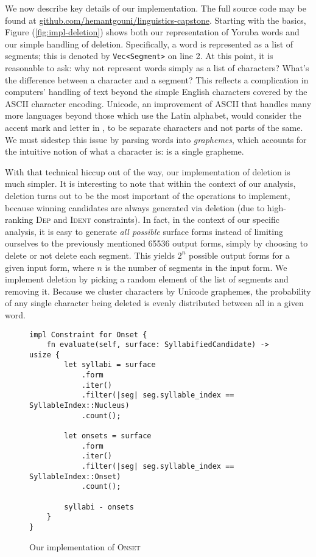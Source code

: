 \documentclass[12pt]{article}
\newcommand{\ident}{\textsc{Ident}}
\newcommand{\dep}{\textsc{Dep}}
\newcommand{\onset}{\textsc{Onset}}
\newcommand{\pref}[1]{(\ref{#1})}
\begin{document}
We now describe key details of our implementation. The full source code may be
found at \href{https://github.com/hemantgouni/linguistics-capstone}{github.com/hemantgouni/linguistics-capstone}.
Starting with the basics, Figure \pref{fig:impl-deletion} shows both our
representation of Yoruba words and our simple handling of deletion.
Specifically, a word is represented as a list of segments; this is denoted by
\texttt{Vec<Segment>} on line 2.
At this point, it is reasonable to ask: why not represent words simply
as a list of characters? What's the difference between a character and a segment?
This reflects a complication in computers' handling of text beyond the
simple English characters covered by the ASCII character encoding. Unicode, an
improvement of ASCII that handles many more languages beyond those which use the
Latin alphabet, would consider the accent mark and letter  in ,
to be separate characters and not parts of the same. We must sidestep this issue by
parsing words into \textit{graphemes}, which accounts for the intuitive notion
of what a character is:  is a single grapheme.

With that technical hiccup out of the way, our implementation of deletion is much
simpler. It is interesting to note that within the context of our analysis,
deletion turns out to be the most important of the operations to implement, because
winning candidates are always generated via deletion (due to high-ranking \dep{}
and \ident{} constraints). In fact, in the context of our specific analysis, it is
easy to generate \textit{all possible} surface forms instead of limiting ourselves to
the previously mentioned 65536 output forms, simply by choosing to delete or not
delete each segment. This yields $2^n$ possible output forms for a given input
form, where $n$ is the number of segments in the input form. We implement deletion
by picking a random element of the list of segments and removing it. Because we
cluster characters by Unicode graphemes, the probability of any single character
being deleted is evenly distributed between all in a given word.

\begin{figure}[h!]
\caption{Our implementation of \onset}
\label{fig:impl-onset}
\begin{verbatim}
impl Constraint for Onset {
    fn evaluate(self, surface: SyllabifiedCandidate) -> usize {
        let syllabi = surface
            .form
            .iter()
            .filter(|seg| seg.syllable_index == SyllableIndex::Nucleus)
            .count();

        let onsets = surface
            .form
            .iter()
            .filter(|seg| seg.syllable_index == SyllableIndex::Onset)
            .count();

        syllabi - onsets
    }
}
\end{verbatim}
\end{figure}
\end{document}

